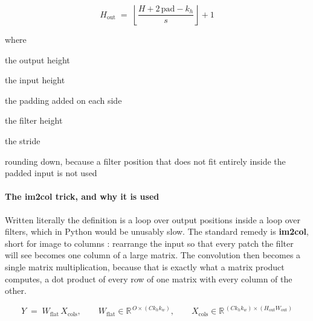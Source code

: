 \begin{equation}
H_{\mathrm{out}} \;=\; \left\lfloor \frac{H + 2\,\mathrm{pad} - k_h}{s} \right\rfloor + 1
\end{equation}

\noindent where
\begin{description}[leftmargin=2.4em,style=nextline,font=\normalfont\ttfamily]\setlength\itemsep{1pt}
  \item[{$H_{\mathrm{out}}$}] \normalfont the output height
  \item[{$H$}] \normalfont the input height
  \item[{$\mathrm{pad}$}] \normalfont the padding added on each side
  \item[{$k_h$}] \normalfont the filter height
  \item[{$s$}] \normalfont the stride
  \item[{$\lfloor \cdot \rfloor$}] \normalfont rounding down, because a filter position that does not fit entirely inside the padded input is not used
\end{description}

\paragraph{The im2col trick, and why it is used}
Written literally the definition is a loop over output positions inside a loop over filters, which in Python would be unusably slow. The standard remedy is \textbf{im2col}, short for image to columns \cite{chellapilla2006}: rearrange the input so that every patch the filter will see becomes one column of a large matrix. The convolution then becomes a single matrix multiplication, because that is exactly what a matrix product computes, a dot product of every row of one matrix with every column of the other.


\begin{equation}
Y \;=\; W_{\mathrm{flat}} \, X_{\mathrm{cols}}, \qquad W_{\mathrm{flat}} \in \mathbb{R}^{\,O \times (C k_h k_w)}, \qquad X_{\mathrm{cols}} \in \mathbb{R}^{\,(C k_h k_w) \times (H_{\mathrm{out}} W_{\mathrm{out}})}
\end{equation}

